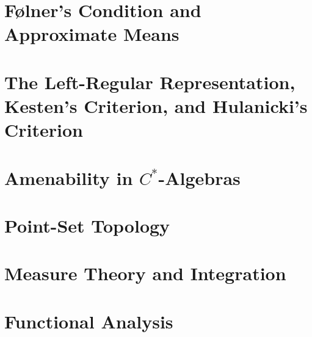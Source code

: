 \documentclass[12pt]{package2}
\begin{document}
\chapter{Følner's Condition and Approximate Means}\label{ch:folner_condition}

\chapter{The Left-Regular Representation, Kesten's Criterion, and Hulanicki's Criterion}\label{ch:left_regular_representation}
\chapter{Amenability in \texorpdfstring{$C^{\ast}$-Algebras}{C*-Algebras}}\label{ch:nuclearity}
\appendix
\chapter{Point-Set Topology}\label{ch:point_set_topology}

\chapter{Measure Theory and Integration}\label{ch:measure_theory}

\chapter{Functional Analysis}\label{ch:functional_analysis}

\nocite{*}
\printbibliography
\end{document}
